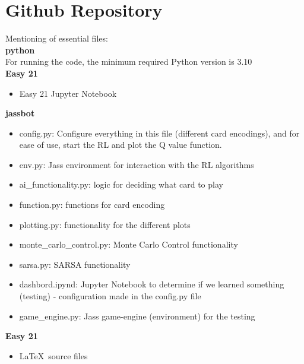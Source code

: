 
\chapter{Github Repository} %

\label{Github Repository} %


Mentioning of essential files: \\

\noindent
\textbf{{\LARGE python}} \\

\noindent
For running the code, the minimum required Python version is 3.10 \\

\noindent
\textbf{Easy 21}
\begin{itemize}
    \item Easy 21 Jupyter Notebook
\end{itemize}

\noindent
\textbf{jassbot}  
\begin{itemize}
    \item config.py: Configure everything in this file (different card encodings), and for ease of use, start the RL and plot the Q value function.
    \item env.py: Jass environment for interaction with the RL algorithms
    \item ai\_functionality.py: logic for deciding what card to play
    \item function.py: functions for card encoding
    \item plotting.py: functionality for the different plots
    \item monte\_carlo\_control.py: Monte Carlo Control functionality
    \item sarsa.py: SARSA functionality
    \item dashbord.ipynd: Jupyter Notebook to determine if we learned something (testing) - configuration made in the config.py file
    \item game\_engine.py: Jass game-engine (environment) for the testing
\end{itemize}

\noindent
\textbf{Easy 21}
\begin{itemize}
    \item \LaTeX\ source files
\end{itemize}
